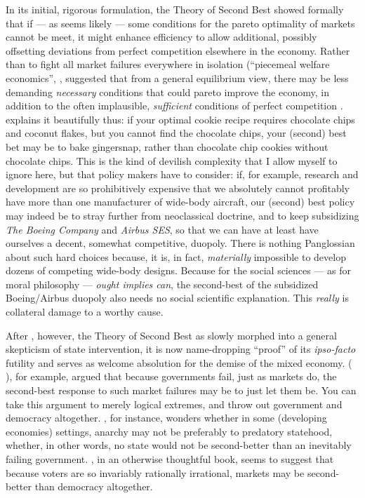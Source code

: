 In its initial, rigorous formulation, the Theory of Second Best showed formally that if --- as seems likely --- some conditions for the pareto optimality of markets cannot be meet, it might enhance efficiency to allow additional, possibly offsetting deviations from perfect competition elsewhere in the economy.
Rather than to fight all market failures everywhere in isolation (``piecemeal welfare economics'', \citeyearpar[11]{Lancaster1956}, \citeauthor{Lancaster1956} suggested that from a general equilibrium view, there may be less demanding \emph{necessary} conditions that could pareto improve the economy, in addition to the often implausible, \emph{sufficient} conditions of perfect competition \citeyearpar[17]{Lancaster1956}.
 \cite{TheEconomist2007} explains it beautifully thus:
if your optimal cookie recipe requires chocolate chips and coconut flakes, but you cannot find the chocolate chips, your (second) best bet may be to bake gingersnap, rather than chocolate chip cookies without chocolate chips.
This is the kind of devilish complexity that I allow myself to ignore here, but that policy makers have to consider:
if, for example, research and development are so prohibitively expensive that we absolutely cannot profitably have more than one manufacturer of wide-body aircraft, our (second) best policy may indeed be to stray further from neoclassical doctrine, and to keep subsidizing \emph{The Boeing Company} and \emph{Airbus SES}, so that we can have at least have ourselves a decent, somewhat competitive, duopoly.
There is nothing Panglossian about such hard choices because, it is, in fact, \emph{materially} impossible to develop dozens of competing wide-body designs.
Because for the social sciences --- as for moral philosophy --- \emph{ought implies can}, the second-best of the subsidized Boeing/Airbus duopoly also needs no social scientific explanation.
This \emph{really} is collateral damage to a worthy cause.

After \citeyear{Lancaster1956}, however, the Theory of Second Best as slowly morphed into a general skepticism of state intervention, it is now name-dropping ``proof'' of its \emph{ipso-facto} futility and serves as welcome absolution for the demise of the mixed economy.
\citeauthor{Wolf1987}(\citeyear{Wolf1987,} \citeyear{Wolf1979}), for example, argued that because governments fail, just as markets do, the second-best response to such market failures may be to just let them be.
You can take this argument to merely logical extremes, and throw out government and democracy altogether.
\cite{Leeson2009}, for instance, wonders whether in some (developing economies) settings, anarchy may not be preferably to predatory statehood, whether, in other words, no state would not be second-better than an inevitably failing government.
\cite{Caplan2007}, in an otherwise thoughtful book, seems to suggest that because voters are so invariably rationally irrational, markets may be second-better than democracy altogether.


